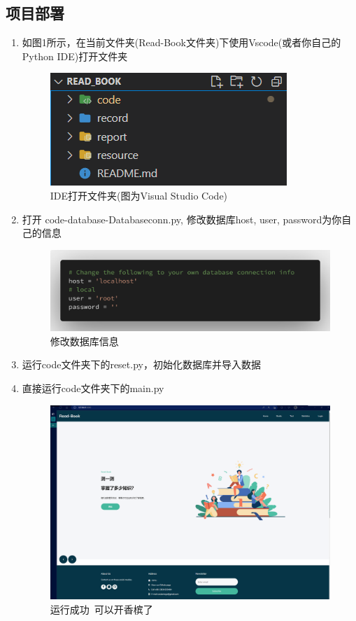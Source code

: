\documentclass[twoside,11pt]{article}
\begin{document}
\subsection{项目部署}
\begin{enumerate}
    \item 如图1所示，在当前文件夹(Read-Book文件夹)下使用Vscode(或者你自己的Python IDE)打开文件夹

          \begin{figure}[H]
              \centering
              \includegraphics[width=0.35\columnwidth]{figures/fileopen.png}
              \caption{IDE打开文件夹(图为Visual Studio Code)}
          \end{figure}
    \item 打开 code-database-Databaseconn.py, 修改数据库host, user, password为你自己的信息

          \begin{figure}[H]
              \centering
              \includegraphics[width=0.9\columnwidth]{figures/sql.png}
              \caption{修改数据库信息}
          \end{figure}
    \item 运行code文件夹下的reset.py，初始化数据库并导入数据
    \item 直接运行code文件夹下的main.py
          \begin{figure}[H]
              \centering
              \includegraphics[width=1\columnwidth]{figures/demo.png}
              \caption{运行成功~可以开香槟了}
          \end{figure}
\end{enumerate}
\end{document}
